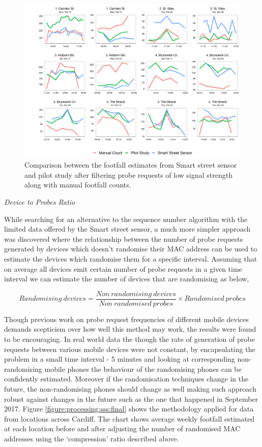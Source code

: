 \begin{figure}
  \includegraphics[trim={15 5 5 5}, clip]{images/processing-sss-compare.png}
  \caption{Comparison between the footfall estimates from Smart street sensor and pilot study after filtering probe requests of low signal strength along with manual footfall counts.}
  \label{figure:processing:sss:comparison}
\end{figure}

\vspace{1.5em}\noindent\textit{Device to Probes Ratio}\vspace{0.5em}

While searching for an alternative to the sequence number algorithm with the limited data offered by the Smart street sensor, a much more simpler approach was discovered where the relationship between the number of probe requests generated by devices which doesn't randomise their MAC address can be used to estimate the devices which randomise them for a specific interval.
Assuming that on average all devices emit certain number of probe requests in a given time interval we can estimate the number of devices that are randomising as below,

\[Randomising\ devices = \frac{Non\ randomising\ devices}{Non\ randomised\ probes}\times{Randomised\ probes}\]

Though previous work on probe request frequencies of different mobile devices demands scepticism over how well this method may work, the results were found to be encouraging.
In real world data the though the rate of generation of probe requests between various mobile devices were not constant, by encapsulating the problem in a small time interval - 5 minutes and looking at corresponding non-randomising mobile phones the behaviour of the randomising phones can be confidently estimated.
Moreover if the randomisation techniques change in the future, the non-randomising phones should change as well making such approach robust against changes in the future such as the one that happened in September 2017.
Figure \ref{figure:processing:sss:final} shows the methodology applied for data from locations across Cardiff.
The chart shows average weekly footfall estimated at each location before and after adjusting the number of randomised MAC addresses using the `compression' ratio described above.

